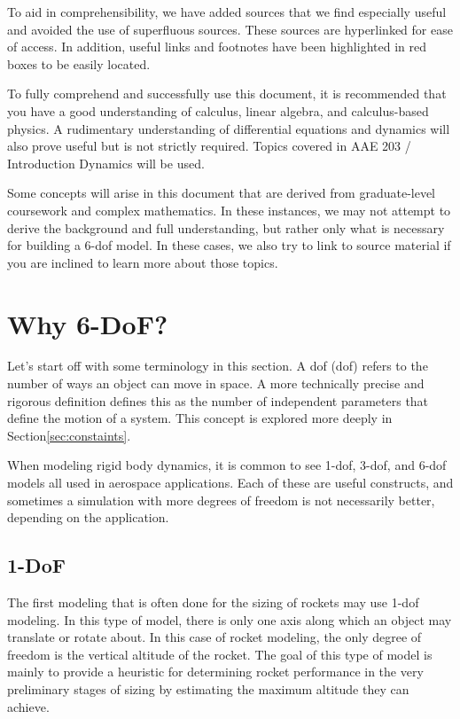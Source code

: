 \documentclass[12pt]{report}
\begin{document}
To aid in comprehensibility, we have added sources that we find especially useful and avoided the use of superfluous sources. These sources are hyperlinked for ease of access. In addition, useful links and footnotes have been highlighted in red boxes to be easily located. 

To fully comprehend and successfully use this document, it is recommended that you have a good understanding of calculus, linear algebra, and calculus-based physics. A rudimentary understanding of differential equations and dynamics will also prove useful but is not strictly required. Topics covered in AAE 203 / Introduction Dynamics will be used. 

Some concepts will arise in this document that are derived from graduate-level coursework and complex mathematics. In these instances, we may not attempt to derive the background and full understanding, but rather only what is necessary for building a 6-\gls{dof} model. In these cases, we also try to link to source material if you are inclined to learn more about those topics.

\section{Why 6-DoF?}
Let’s start off with some terminology in this section. A \acrlong{dof} (\gls{dof}) refers to the number of ways an object can move in space. A more technically precise and rigorous definition defines this as the number of independent parameters that define the motion of a system. This concept is explored more deeply in Section\ref{sec:constaints}.  

When modeling rigid body dynamics, it is common to see 1-\gls{dof}, 3-\gls{dof}, and 6-\gls{dof} models all used in aerospace applications. Each of these are useful constructs, and sometimes a simulation with more degrees of freedom is not necessarily better, depending on the application.
\subsection{1-DoF}
The first modeling that is often done for the sizing of rockets may use 1-\gls{dof} modeling. In this type of model, there is only one axis along which an object may translate or rotate about. In this case of rocket modeling, the only degree of freedom is the vertical altitude of the rocket. The goal of this type of model is mainly to provide a heuristic for determining rocket performance in the very preliminary stages of sizing by estimating the maximum altitude they can achieve.
\end{document}
